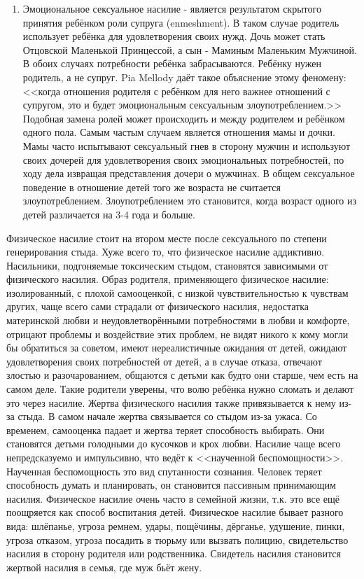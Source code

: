 \documentclass[10pt, fleqn]{article}
\begin{document}
\begin{enumerate}
\begin{enumerate}
\end{enumerate}

\item Эмоциональное сексуальное насилие - является результатом скрытого принятия ребёнком роли супруга (enmeshment). В таком случае родитель использует ребёнка для удовлетворения своих нужд. Дочь может стать Отцовской Маленькой Принцессой, а сын - Маминым Маленьким Мужчиной. В обоих случаях потребности ребёнка забрасываются. Ребёнку нужен родитель, а не супруг.
Pia Mellody даёт такое объяснение этому феномену: <<когда отношения родителя с ребёнком для него важнее отношений с супругом, это и будет эмоциональным сексуальным злоупотреблением.>>
Подобная замена ролей может происходить и между родителем и ребёнком одного пола. Самым частым случаем является отношения мамы и дочки. Мамы часто испытывают сексуальный гнев в сторону мужчин и используют своих дочерей для удовлетворения своих эмоциональных потребностей, по ходу дела извращая представления дочери о мужчинах.
В общем сексуальное поведение в отношение детей того же возраста не считается злоупотреблением. Злоупотреблением это становится, когда возраст одного из детей различается на 3-4 года и больше.

\end{enumerate}



Физическое насилие стоит на втором месте после сексуального по степени генерирования стыда. Хуже всего то, что физическое насилие аддиктивно. Насильники, подгоняемые токсическим стыдом, становятся зависимыми от физического насилия.
Образ родителя, применяющего физическое насилие: изолированный, с плохой самооценкой, с низкой чувствительностью к чувствам других, чаще всего сами страдали от физического насилия, недостатка материнской любви и неудовлетворёнными потребностями в любви и комфорте, отрицают проблемы и воздействие этих проблем, не видят никого к кому могли бы обратиться за советом, имеют нереалистичные ожидания от детей, ожидают удовлетворения своих потребностей от детей, а в случае отказа, отвечают злостью и разочарованием, общаются с детьми как будто они старше, чем есть на самом деле.
Такие родители уверены, что волю ребёнка нужно сломать и делают это через насилие.
Жертва физического насилия также привязывается к нему из-за стыда. В самом начале жертва связывается со стыдом из-за ужаса. Со временем, самооценка падает и жертва теряет способность выбирать. Они становятся детьми голодными до кусочков и крох любви.
Насилие чаще всего непредсказуемо и импульсивно, что ведёт к <<наученной беспомощности>>. Наученная беспомощность это вид спутанности сознания. Человек теряет способность думать и планировать, он становится пассивным принимающим насилия.
Физическое насилие очень часто в семейной жизни, т.к. это все ещё поощряется как способ воспитания детей.
Физическое насилие бывает разного вида: шлёпанье, угроза ремнем, удары, пощёчины, дёрганье, удушение, пинки, угроза отказом, угроза посадить в тюрьму или вызвать полицию, свидетельство насилия в сторону родителя или родственника.
Свидетель насилия становится жертвой насилия в семья, где муж бьёт жену.
\end{document}
